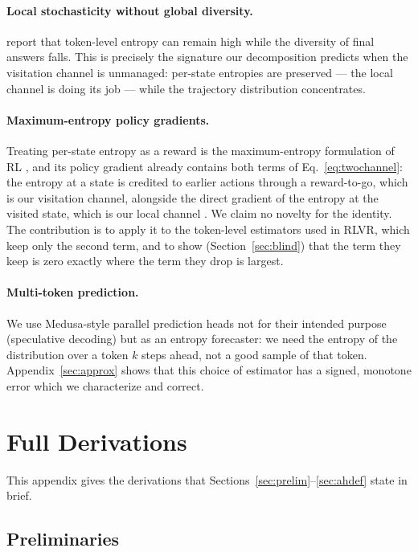 \documentclass[11pt]{article}
\begin{document}
\paragraph{Local stochasticity without global diversity.}
\citet{wu2025ainvisible} report that token-level entropy can remain high while the
diversity of final answers falls. This is precisely the signature our decomposition
predicts when the visitation channel is unmanaged: per-state entropies are
preserved --- the local channel is doing its job --- while the trajectory
distribution concentrates.

\paragraph{Maximum-entropy policy gradients.}
Treating per-state entropy as a reward is the maximum-entropy formulation of RL
\citep{ziebart2008maximum,levine2018reinforcement}, and its policy gradient already
contains both terms of Eq.~\eqref{eq:twochannel}: the entropy at a state is credited
to earlier actions through a reward-to-go, which is our visitation channel, alongside
the direct gradient of the entropy at the visited state, which is our local channel
\citep{schulman2017equivalence}. We claim no novelty for the identity. The
contribution is to apply it to the token-level estimators used in RLVR, which keep
only the second term, and to show (Section~\ref{sec:blind}) that the term they keep
is zero exactly where the term they drop is largest.

\paragraph{Multi-token prediction.}
We use Medusa-style parallel prediction heads \citep{medusa} not for their intended
purpose (speculative decoding) but as an entropy forecaster: we need the entropy of
the distribution over a token $k$ steps ahead, not a good sample of that token.
Appendix~\ref{sec:approx} shows that this choice of estimator has a signed,
monotone error which we characterize and correct.


\section{Full Derivations}
\label{sec:app:derivation}
This appendix gives the derivations that Sections~\ref{sec:prelim}--\ref{sec:ahdef} state in brief.

\subsection{Preliminaries}
\label{sec:prelim-app}
\end{document}
